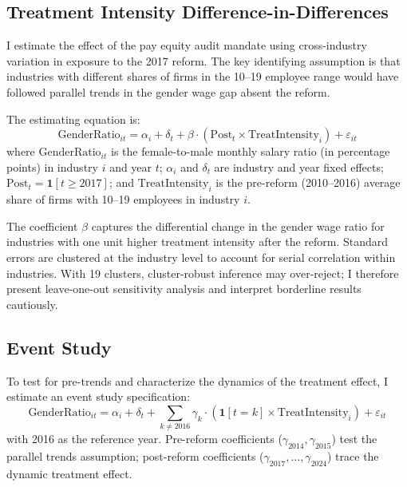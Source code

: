 \documentclass[12pt]{article}
\begin{document}
\subsection{Treatment Intensity Difference-in-Differences}

I estimate the effect of the pay equity audit mandate using cross-industry variation in exposure to the 2017 reform. The key identifying assumption is that industries with different shares of firms in the 10--19 employee range would have followed parallel trends in the gender wage gap absent the reform.

The estimating equation is:
\begin{equation}
\text{GenderRatio}_{it} = \alpha_i + \delta_t + \beta \cdot (\text{Post}_{t} \times \text{TreatIntensity}_{i}) + \varepsilon_{it}
\label{eq:main}
\end{equation}
where $\text{GenderRatio}_{it}$ is the female-to-male monthly salary ratio (in percentage points) in industry $i$ and year $t$; $\alpha_i$ and $\delta_t$ are industry and year fixed effects; $\text{Post}_{t} = \mathbf{1}[t \geq 2017]$; and $\text{TreatIntensity}_{i}$ is the pre-reform (2010--2016) average share of firms with 10--19 employees in industry $i$.

The coefficient $\beta$ captures the differential change in the gender wage ratio for industries with one unit higher treatment intensity after the reform. Standard errors are clustered at the industry level to account for serial correlation within industries. With 19 clusters, cluster-robust inference may over-reject; I therefore present leave-one-out sensitivity analysis and interpret borderline results cautiously.

\subsection{Event Study}

To test for pre-trends and characterize the dynamics of the treatment effect, I estimate an event study specification:
\begin{equation}
\text{GenderRatio}_{it} = \alpha_i + \delta_t + \sum_{k \neq 2016} \gamma_k \cdot (\mathbf{1}[t = k] \times \text{TreatIntensity}_{i}) + \varepsilon_{it}
\label{eq:eventstudy}
\end{equation}
with 2016 as the reference year. Pre-reform coefficients ($\gamma_{2014}, \gamma_{2015}$) test the parallel trends assumption; post-reform coefficients ($\gamma_{2017}, \ldots, \gamma_{2024}$) trace the dynamic treatment effect.
\end{document}
